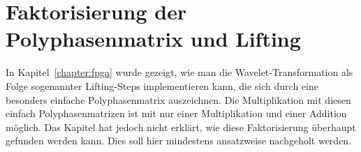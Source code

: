 %
%
%
\chapter{Faktorisierung der Polyphasenmatrix und Lifting
\label{chapter:lifting}}
\rhead{}
\begin{refsection}

In Kapitel~\ref{chapter:fpga} wurde gezeigt, wie man die
Wavelet-Transformation als Folge sogenannter Lifting-Steps implementieren
kann, die sich durch eine besonders einfache Polyphasenmatrix auszeichnen.
Die Multiplikation mit diesen einfach Polyphasenmatrizen ist mit nur
einer Multiplikation und einer Addition möglich.
Das Kapitel hat jedoch nicht erklärt, wie diese Faktorisierung
überhaupt gefunden werden kann.
Dies soll hier mindestens ansatzweise nachgeholt werden.




\printbibliography[heading=subbibliography]
\end{refsection}
